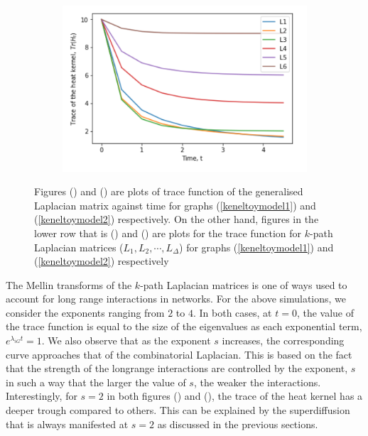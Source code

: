 \documentclass[10pt,a4paper]{article}
\begin{document}
\begin{figure}[H]
\begin{subfigure}[b]{0.45\textwidth}
		    	\caption{}
		    	\label{model1-kpath}
		    \end{subfigure}~
		    \begin{subfigure}[b]{0.45\textwidth}
		    	\includegraphics[width= \textwidth]{images/model-2-klap.png}
		    	\caption{}
		    	\label{model2-kpath}
		    \end{subfigure}
			\caption{Figures () and () are plots of trace function of the generalised Laplacian matrix against time for graphs (\ref{keneltoymodel1}) and (\ref{keneltoymodel2}) respectively. On the other hand, figures in the lower row that is () and () are plots for the trace function for $k$-path Laplacian matrices ($L_1, L_2,\cdots, L_{\Delta}$) for graphs (\ref{keneltoymodel1}) and (\ref{keneltoymodel2}) respectively  }
			\label{}
		\end{figure}
	  The Mellin transforms of the $k$-path Laplacian matrices is one of ways used to account for long range interactions in networks. For the above simulations, we consider the exponents ranging from $2$ to $4$. In both cases, at $t=0$, the value of the trace function is equal to the size of the eigenvalues as each exponential term, $e^{\lambda_{iG}t} = 1$.  We also observe that as the exponent $s$ increases, the corresponding curve approaches that of the combinatorial Laplacian. This is based on the fact that the strength of the longrange interactions are controlled by the exponent, $s$ in such a way that the larger the value of $s$, the weaker the interactions. Interestingly, for $s=2$ in both figures () and (), the trace of the heat kernel has a deeper trough compared to others. This can be explained by the superdiffusion that is always manifested at $s=2$ as discussed in the previous sections.
	  
\end{document}
